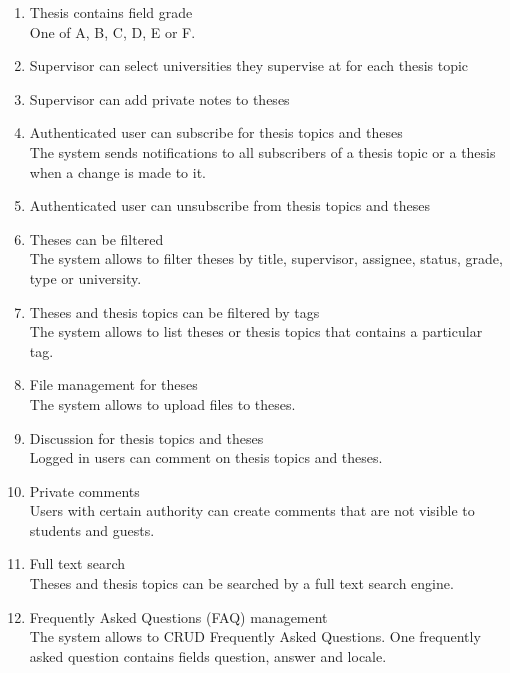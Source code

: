 \begin{enumerate}
    \item Thesis contains field grade\\
    One of A, B, C, D, E or F.

    \item Supervisor can select universities they supervise at for each thesis topic

    \item Supervisor can add private notes to theses

    \item Authenticated user can subscribe for thesis topics and theses\\
    The system sends notifications to all subscribers of a thesis topic or a thesis when a change is made to it.

    \item Authenticated user can unsubscribe from thesis topics and theses

    \item Theses can be filtered\\
    The system allows to filter theses by title, supervisor, assignee, status, grade, type or university.

    \item Theses and thesis topics can be filtered by tags\\
    The system allows to list theses or thesis topics that contains a particular tag.

    \item File management for theses\\
    The system allows to upload files to theses.

    \item Discussion for thesis topics and theses\\
    Logged in users can comment on thesis topics and theses.

    \item Private comments\\
    Users with certain authority can create comments that are not visible to students and guests.

    \item Full text search\\
    Theses and thesis topics can be searched by a full text search engine.

    \item Frequently Asked Questions (FAQ) management\\
    The system allows to CRUD Frequently Asked Questions. One frequently asked question contains fields question, answer and locale.

\end{enumerate}


